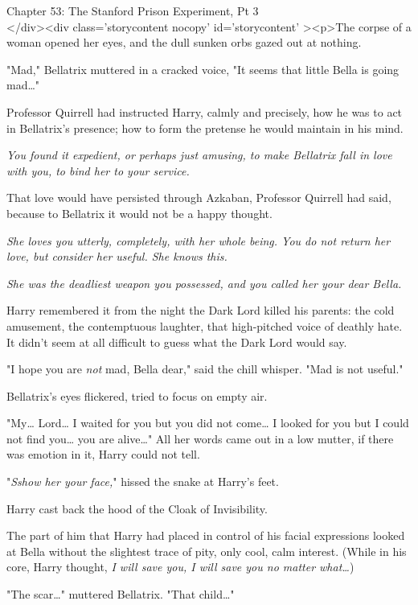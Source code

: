 
Chapter 53: The Stanford Prison Experiment, Pt 3\\
</div><div  class='storycontent nocopy' id='storycontent' ><p>The corpse of a 
woman opened her eyes, and the dull sunken orbs gazed out at nothing.

"Mad," Bellatrix muttered in a cracked voice, "It seems that little Bella is 
going mad{\ldots}"

Professor Quirrell had instructed Harry, calmly and precisely, how he was to 
act in Bellatrix's presence; how to form the pretense he would maintain in his 
mind.

\emph{You found it expedient, or perhaps just amusing, to make Bellatrix fall 
in love with you, to bind her to your service.}

That love would have persisted through Azkaban, Professor Quirrell had said, 
because to Bellatrix it would not be a happy thought.

\emph{She loves you utterly, completely, with her whole being. You do not 
return her love, but consider her useful. She knows this.}

\emph{She was the deadliest weapon you possessed, and you called her your dear 
Bella.}

Harry remembered it from the night the Dark Lord killed his parents: the cold 
amusement, the contemptuous laughter, that high-pitched voice of deathly hate. 
It didn't seem at all difficult to guess what the Dark Lord would say.

"I hope you are \emph{not} mad, Bella dear," said the chill whisper. "Mad is 
not useful."

Bellatrix's eyes flickered, tried to focus on empty air.

"My{\ldots} Lord{\ldots} I waited for you but you did not come{\ldots} I looked 
for you but I could not find you{\ldots} you are alive{\ldots}" All her words 
came out in a low mutter, if there was emotion in it, Harry could not tell.

"\emph{Sshow her your face,}" hissed the snake at Harry's feet.

Harry cast back the hood of the Cloak of Invisibility.

The part of him that Harry had placed in control of his facial expressions 
looked at Bella without the slightest trace of pity, only cool, calm interest. 
(While in his core, Harry thought, \emph{I will save you, I will save you no 
matter what{\ldots}})

"The scar{\ldots}" muttered Bellatrix. "That child{\ldots}"

